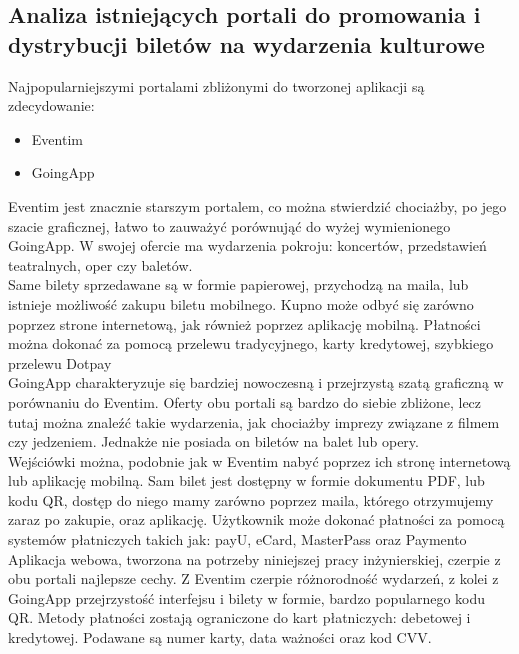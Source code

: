 \documentclass[12pt]{article}
\begin{document}
\begin{sloppypar}
{  \subsection{Analiza istniejących portali do promowania i dystrybucji biletów na wydarzenia kulturowe}
  {
    Najpopularniejszymi portalami zbliżonymi do tworzonej aplikacji są zdecydowanie:
    \begin{itemize}
      \item Eventim
      \item GoingApp
    \end{itemize}
    Eventim jest znacznie starszym portalem, co można stwierdzić chociażby, po jego szacie graficznej, łatwo to zauważyć porównująć do wyżej wymienionego GoingApp. 
    W swojej ofercie ma wydarzenia pokroju: koncertów, przedstawień teatralnych, oper czy baletów.\\
    Same bilety sprzedawane są w formie papierowej, przychodzą na maila, lub istnieje możliwość zakupu biletu mobilnego. 
    Kupno może odbyć się zarówno poprzez strone internetową, jak również poprzez aplikację mobilną. 
    Płatności można dokonać za pomocą przelewu tradycyjnego, karty kredytowej, szybkiego przelewu Dotpay\\
    GoingApp charakteryzuje się bardziej nowoczesną i przejrzystą szatą graficzną w porównaniu do Eventim. 
    Oferty obu portali są bardzo do siebie zbliżone, lecz tutaj można znaleźć takie wydarzenia, jak chociażby imprezy związane z filmem czy jedzeniem.
    Jednakże nie posiada on biletów na balet lub opery.\\
    Wejściówki można, podobnie jak w Eventim nabyć poprzez ich stronę internetową lub aplikację mobilną. 
    Sam bilet jest dostępny w formie dokumentu PDF, lub kodu QR, dostęp do niego mamy zarówno poprzez maila, którego otrzymujemy zaraz po zakupie, oraz aplikację.
    Użytkownik może dokonać płatności za pomocą systemów płatniczych takich jak: payU, eCard, MasterPass oraz Paymento\textregistered \\
    Aplikacja webowa, tworzona na potrzeby niniejszej pracy inżynierskiej, czerpie z obu portali najlepsze cechy. 
    Z Eventim czerpie różnorodność wydarzeń, z kolei z GoingApp przejrzystość interfejsu i bilety w formie, bardzo popularnego kodu QR.
    Metody płatności zostają ograniczone do kart płatniczych: debetowej i kredytowej. Podawane są numer karty, data ważności oraz kod CVV.
  }
}
\end{sloppypar}
\end{document}
